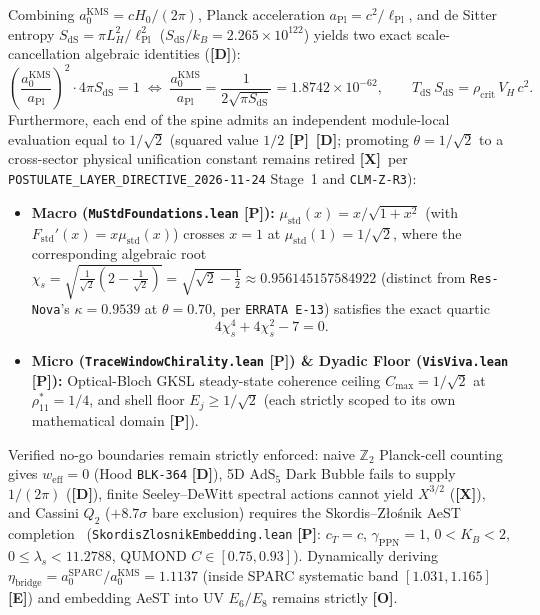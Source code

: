 \documentclass[11pt,a4paper]{article}
\newcommand{\badgeP}{\textbf{\color{sqJade}[P]}}
\newcommand{\badgeD}{\textbf{\color{sqRose}[D]}}
\newcommand{\badgeE}{\textbf{\color{sqIce}[E]}}
\newcommand{\badgeO}{\textbf{\color{sqAmber}[O]}}
\newcommand{\badgeX}{\textbf{\color{sqKilled}[X]}}
\theoremstyle{definition}
\begin{document}
Combining $a_0^{\mathrm{KMS}} = cH_0/(2\pi)$, Planck acceleration $a_{\mathrm{Pl}} = c^2/\ell_{\mathrm{Pl}}$, and de Sitter entropy $S_{\mathrm{dS}} = \pi L_H^2/\ell_{\mathrm{Pl}}^2$ ($S_{\mathrm{dS}}/k_B = 2.265\times 10^{122}$) yields two exact scale-cancellation algebraic identities (\badgeD):
\begin{equation}
  \left(\frac{a_0^{\mathrm{KMS}}}{a_{\mathrm{Pl}}}\right)^{\!2} \cdot 4\pi S_{\mathrm{dS}} = 1 \;\Longleftrightarrow\; \frac{a_0^{\mathrm{KMS}}}{a_{\mathrm{Pl}}} = \frac{1}{2\sqrt{\pi S_{\mathrm{dS}}}} = 1.8742\times 10^{-62},
  \qquad T_{\mathrm{dS}}\,S_{\mathrm{dS}} = \rho_{\mathrm{crit}}\,V_H\,c^2.
\end{equation}
Furthermore, each end of the spine admits an independent module-local evaluation equal to $1/\sqrt{2}$ (squared value $1/2$ \badgeP\ \badgeD; promoting $\theta = 1/\sqrt{2}$ to a cross-sector physical unification constant remains retired \badgeX\ per \texttt{POSTULATE\_LAYER\_DIRECTIVE\_2026-11-24} Stage~1 and \texttt{CLM-Z-R3}):
\begin{itemize}
  \item \textbf{Macro (\texttt{MuStdFoundations.lean} \badgeP):} $\mu_{\mathrm{std}}(x) = x/\sqrt{1+x^2}$ (with $F_{\mathrm{std}}'(x) = x\mu_{\mathrm{std}}(x)$) crosses $x=1$ at $\mu_{\mathrm{std}}(1) = 1/\sqrt{2}$, where the corresponding algebraic root $\chi_s = \sqrt{\frac{1}{\sqrt{2}}(2-\frac{1}{\sqrt{2}})} = \sqrt{\sqrt{2} - \frac{1}{2}} \approx 0.956145157584922$ (distinct from \texttt{Res-Nova}'s $\kappa = 0.9539$ at $\theta = 0.70$, per \texttt{ERRATA E-13}) satisfies the exact quartic
  \begin{equation}
    4\chi_s^4 + 4\chi_s^2 - 7 = 0.
  \end{equation}
  \item \textbf{Micro (\texttt{TraceWindowChirality.lean} \badgeP) \& Dyadic Floor (\texttt{VisViva.lean} \badgeP):} Optical-Bloch GKSL steady-state coherence ceiling $C_{\max} = 1/\sqrt{2}$ at $\rho_{11}^* = 1/4$, and shell floor $E_j \ge 1/\sqrt{2}$ (each strictly scoped to its own mathematical domain \badgeP).
\end{itemize}
Verified no-go boundaries remain strictly enforced: naive $\mathbb{Z}_2$ Planck-cell counting gives $w_{\mathrm{eff}}=0$ (Hood \texttt{BLK-364} \badgeD), 5D $\mathrm{AdS}_5$ Dark Bubble fails to supply $1/(2\pi)$ (\badgeD), finite Seeley--DeWitt spectral actions cannot yield $X^{3/2}$ (\badgeX), and Cassini $Q_2$ ($+8.7\sigma$ bare exclusion) requires the Skordis--Złośnik AeST completion~\cite{SkordisZlosnik2021} (\texttt{SkordisZlosnikEmbedding.lean} \badgeP: $c_T=c$, $\gamma_{\mathrm{PPN}}=1$, $0<K_B<2$, $0\le\lambda_s<11.2788$, QUMOND $C\in[0.75,0.93]$). Dynamically deriving $\eta_{\mathrm{bridge}} = a_0^{\mathrm{SPARC}}/a_0^{\mathrm{KMS}} = 1.1137$ (inside SPARC systematic band $[1.031, 1.165]$ \badgeE) and embedding AeST into UV $E_6/E_8$ remains strictly \badgeO.
\end{document}

